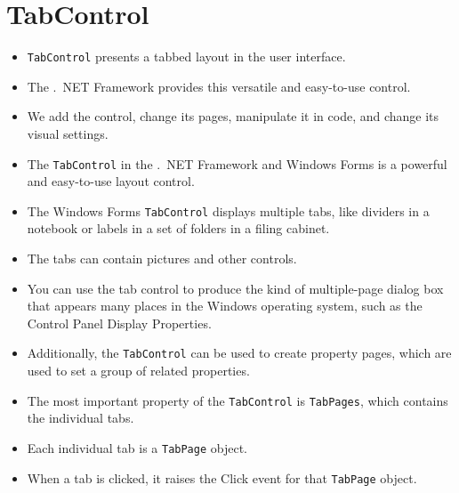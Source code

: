 
\section{TabControl}
\begin{itemize}
	\item \texttt{TabControl} presents a tabbed layout in the user interface. 
	\item The .\ NET Framework provides this versatile and easy-to-use control. 
	\item We add the control, change its pages, manipulate it in {\cs} code, and change its visual settings. 
	\item The \texttt{TabControl} in the .\ NET Framework and Windows Forms is a powerful and easy-to-use layout control. 
	\item The Windows Forms \texttt{TabControl} displays multiple tabs, like dividers in a notebook or labels in a set of folders in a filing cabinet. 
	\item The tabs can contain pictures and other controls. 
	\item You can use the tab control to produce the kind of multiple-page dialog box that appears many places in the Windows operating system, such as the Control Panel Display Properties. 
	\item Additionally, the \texttt{TabControl} can be used to create property pages, which are used to set a group of related properties.
	\item The most important property of the \texttt{TabControl} is \texttt{TabPages}, which contains the individual tabs.
	\item Each individual tab is a \texttt{TabPage} object. 
	\item When a tab is clicked, it raises the Click event for that \texttt{TabPage} object.
\end{itemize}


